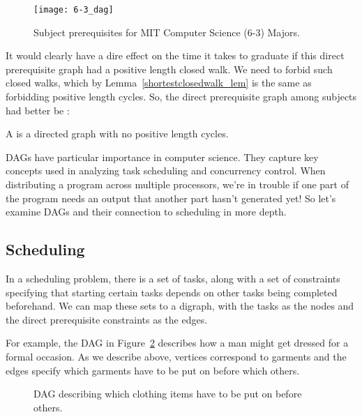 \begin{figure}

\texttt{[image: 6-3\_dag]}

\caption{Subject prerequisites for MIT Computer Science (6-3) Majors.}

\label{6-3_subjects}

\end{figure}

It would clearly have a dire effect on the time it takes to graduate
if this direct prerequisite graph had a positive length closed walk.
We need to forbid such closed walks, which by
Lemma~\ref{shortestclosedwalk_lem} is the same as forbidding positive
length cycles.  So, the direct prerequisite graph among subjects had
better be :

\begin{definition}
A  is a directed graph with no
positive length cycles.
\end{definition}

DAGs have particular importance in computer science.  They capture key
concepts used in analyzing task scheduling and concurrency control.
When distributing a program across multiple processors, we're in
trouble if one part of the program needs an output that another part
hasn't generated yet!  So let's examine DAGs and their connection to
scheduling in more depth.

\iffalse
We won't be working on any examples quite so
technical in this chapter, but\fi


\subsection{Scheduling}\label{sched_subsec}

In a scheduling problem, there is a set of tasks, along with a set of
constraints specifying that starting certain tasks depends on other
tasks being completed beforehand.  We can map these sets to a digraph,
with the tasks as the nodes and the direct prerequisite constraints as
the edges.

For example, the DAG in Figure~\ref{fig:7FP} describes how a man might
get dressed for a formal occasion.  As we describe above, vertices
correspond to garments and the edges specify which garments have to be
put on before which others.

\begin{figure}


\caption{DAG describing which clothing items have to be put on before others.}

\label{fig:7FP}

\end{figure}

